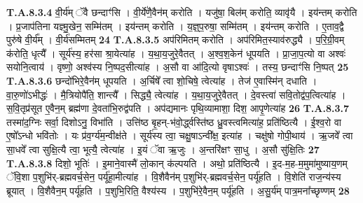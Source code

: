 \documentclass[17pt]{extarticle}
\begin{document}
                  \newline
                                                                  \textbf{ T.A.8.3.4} \newline
                  वी॒र्य॑म् ॅवै छन्दाꣳ॑सि । वी॒र्ये॑णै॒वैन॑म् करोति ।  यजु॑षा॒ बिल॑म् करोति॒ व्यावृ॑यै । इय॑न्तम् करोति ।  प्र॒जाप॑तिना यज्ञ्मु॒खेन॒ सम्मि॑तम् । इय॑न्तम् करोति ।  य॒ज्ञ्॒प॒रुषा॒ सम्मि॑तम् । इय॑न्तम् करोति ।  ए॒ताव॒द्वै पुरु॑षे वी॒र्य᳚म् । वी॒र्य॑सम्मितम् \textbf{ 24} \newline
                  \newline
                                                                  \textbf{ T.A.8.3.5} \newline
                  अप॑रिमितम् करोति । अप॑रिमित॒स्याव॑रुद्ध्यै । प॒रि॒ग्री॒वम् क॑रोति॒ धृत्यै᳚ । सूर्य॑स्य॒ हर॑सा श्रा॒येत्या॑ह । य॒था॒य॒जुरे॒वैतत् । अ॒श्व॒श॒केन॑ धूपयति । प्रा॒जा॒प॒त्यो वा अश्वः॑ सयोनि॒त्वाय॑ । वृष्णो॒ अश्व॑स्य नि॒ष्पद॒सीत्या॑ह ।  अ॒सौ वा आ॑दि॒त्यो वृषाऽश्वः॑ । तस्य॒ छन्दाꣳ॑सि नि॒ष्पत् \textbf{ 25} \newline
                  \newline
                                                                  \textbf{ T.A.8.3.6} \newline
                  छन्दो॑भिरे॒वैन॑म् धूपयति । अ॒र्चिषे᳚ त्वा शो॒चिषे॒ त्वेत्या॑ह । तेज॑ ए॒वास्मि॑न् दधाति । वा॒रु॒णो॑ऽभीद्धः॑ । मै॒त्रियोपै॑ति॒ शान्त्यै᳚ । सिद्ध्यै॒ त्वेत्या॑ह । य॒था॒य॒जुरे॒वैतत् । दे॒वस्त्वा॑ सवि॒तोद्व॑प॒त्वित्या॑ह ।  स॒वि॒तृप्र॑सूत ए॒वैन॒म् ब्रह्म॑णा दे॒वता॑भि॒रुद्व॑पति । अप॑द्यमानः पृथि॒व्यामाशा॒ दिश॒ आपृ॒णेत्या॑ह \textbf{ 26} \newline
                  \newline
                                                                  \textbf{ T.A.8.3.7} \newline
                  तस्मा॑द॒ग्निः सर्वा॒ दिशोऽनु॒ विभा॑ति ।  उत्ति॑ष्ठ बृ॒हन्-भ॑वो॒र्द्ध्वस्ति॑ष्ठ ध्रु॒वस्त्वमित्या॑ह॒ प्रति॑ष्ठित्यै ।  ई॒श्व॒रो वा ए॒षो᳚ऽन्धो भवि॑तोः ।  यः प्र॑व॒र्ग्य॑म॒न्वीक्ष॑ते । सूर्य॑स्य त्वा॒ चक्षु॒षाऽन्वी᳚क्ष॒ इत्या॑ह ।  चक्षु॑षो गोपी॒थाय॑ । ऋ॒जवे᳚ त्वा सा॒धवे᳚ त्वा सुक्षि॒त्यै त्वा॒ भूत्यै॒ त्वेत्या॑ह । इ॒यं ॅवा ऋ॒जुः । अ॒न्तरि॑क्षꣳ सा॒धु । अ॒सौ सु॑क्षि॒तिः \textbf{ 27} \newline
                  \newline
                                                                  \textbf{ T.A.8.3.8} \newline
                  दिशो॒ भूतिः॑ । इ॒माने॒वास्मै॑ लो॒कान् क॑ल्पयति । अथो॒ प्रति॑ष्ठित्यै । इ॒द-म॒ह-म॒मुमा॑मुष्याय॒णम् ॅवि॒शा प॒शुभि॑र्-ब्रह्मवर्च॒सेन॒ पर्यू॑हा॒मीत्या॑ह ।  वि॒शैवैन॑म् प॒शुभि॑र्-ब्रह्मवर्च॒सेन॒ पर्यू॑हति ।  वि॒शेति॑ राज॒न्य॑स्य ब्रूयात् । वि॒शैवैन॒म् पर्यू॑हति । प॒शुभि॒रिति॒ वैश्य॑स्य । प॒शुभि॑रे॒वैन॒म् पर्यू॑हति । अ॒सु॒र्य॑म् पात्र॒मना᳚च्छृण्णम् \textbf{ 28} \newline
\end{document}
